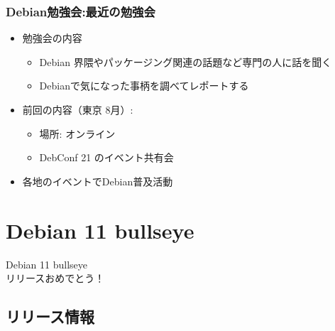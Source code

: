 \begin{frame}
  
\frametitle{Debian勉強会:最近の勉強会}
  
\begin{itemize}
\item 勉強会の内容
  \begin{itemize}
  \item Debian 界隈やパッケージング関連の話題など専門の人に話を聞く
  \item Debianで気になった事柄を調べてレポートする
  \end{itemize}
\item 前回の内容（東京 8月）:
  \begin{itemize}
  \item 場所: オンライン
  \item DebConf 21 のイベント共有会
  \end{itemize}
\item 各地のイベントでDebian普及活動
\end{itemize}

\end{frame}


\section{Debian 11 bullseye}

\begin{frame}
  \begin{center}\Huge{Debian 11 bullseye\\リリースおめでとう！}\end{center}
\end{frame}

\subsection{リリース情報}

